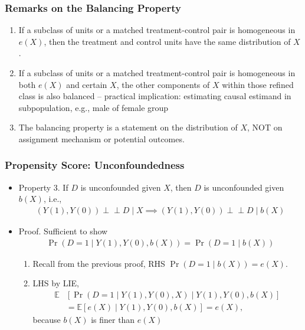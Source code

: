 \documentclass[10pt, handout]{beamer}
\newcommand{\ind}{\perp\!\!\!\!\perp}
\begin{document}
    \begin{frame}
      \frametitle{Remarks on the Balancing Property}

      \begin{enumerate}
        \item If a subclass of units or a matched treatment-control pair is homogeneous in $e(X)$, then the treatment and control units have the same distribution of $X$.
        \item If a subclass of units or a matched treatment-control pair is homogeneous in both $e(X)$ and certain $X$, the other components of $X$ within those refined class is also balanced -- practical implication: estimating causal estimand in subpopulation, e.g., male of female group
        \item The balancing property is a statement on the distribution of $X$, NOT on assignment mechanism or potential outcomes.
      \end{enumerate} 

    \end{frame}
    

    \begin{frame}
      \frametitle{Propensity Score: Unconfoundedness}

      \begin{itemize}
        \item Property 3. If $D$ is unconfounded given $X$, then $D$ is unconfounded given $b(X)$, i.e., 
        \begin{align*}
          \left( Y(1), Y(0) \right) \ind D \mid X \implies \left( Y(1), Y(0) \right) \ind D \mid b(X)
        \end{align*}
        \item Proof. Sufficient to show
        \begin{align*}
          \Pr \left( D = 1 \mid Y(1), Y(0), b(X) \right) = \Pr \left( D = 1 \mid b(X) \right)
        \end{align*}
        \begin{enumerate}
          \item Recall from the previous proof, RHS $\Pr \left( D = 1 \mid b(X) \right) = e(X)$.
          \item LHS by LIE, 
          \begin{align*}
            \mathbb{E} &\left[ \Pr \left( D = 1 \mid Y(1), Y(0), X \right) \mid Y(1), Y(0), b(X) \right] \\
            &= \mathbb{E} \left[ e(X) \mid Y(1), Y(0), b(X) \right] = e(X),
          \end{align*}
          because $b(X)$ is finer than $e(X)$
        \end{enumerate}
      \end{itemize}

    \end{frame}
    
\end{document}
